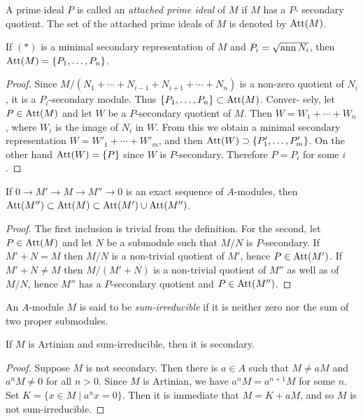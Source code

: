 A prime ideal $P$ is called an \emph{attached prime ideal} of $M$ if $M$ has a $P$-
secondary quotient. The set of the attached prime ideals of $M$ is denoted by
$\operatorname{Att}(M)$.

\begin{theorem}\label{thm:6.9}
If $(*)$ is a minimal secondary representation of $M$ and $P_i =
\sqrt{\operatorname{ann} N_i}$, then $\operatorname{Att}(M) = \{P_1, \ldots, P_n\}$.
\end{theorem}

\begin{proof}
Since $M/(N_1 + \cdots + N_{i-1} + N_{i+1} + \cdots + N_n)$ is a non-zero quotient
of $N_i$, it is a $P_i$-secondary module. Thus $\{P_1, \ldots, P_n\} \subset \operatorname{Att}(M)$. Conver-
sely, let $P \in \operatorname{Att}(M)$ and let $W$ be a $P$-secondary quotient of $M$. Then $W =
W_1 + \cdots + W_n$, where $W_i$ is the image of $N_i$ in $W$. From this we obtain a
minimal secondary representation $W = W'_1 + \cdots + W'_m$, and then
$\operatorname{Att}(W) \supset \{P'_1, \ldots, P'_m\}$. On the other hand $\operatorname{Att}(W) = \{P\}$ since $W$ is
$P$-secondary. Therefore $P = P_i$ for some $i$.
\end{proof}

\begin{theorem}\label{thm:6.10}
If $0 \to M' \to M \to M'' \to 0$ is an exact sequence of
$A$-modules, then $\operatorname{Att}(M'') \subset \operatorname{Att}(M) \subset \operatorname{Att}(M') \cup \operatorname{Att}(M'')$.
\end{theorem}

\begin{proof}
The first inclusion is trivial from the definition. For the second, let
$P \in \operatorname{Att}(M)$ and let $N$ be a submodule such that $M/N$ is $P$-secondary. If
$M' + N = M$ then $M/N$ is a non-trivial quotient of $M'$, hence $P \in \operatorname{Att}(M')$.
If $M' + N \neq M$ then $M/(M' + N)$ is a non-trivial quotient of $M''$ as well
as of $M/N$, hence $M''$ has a $P$-secondary quotient and $P \in \operatorname{Att}(M'')$.
\end{proof}

An $A$-module $M$ is said to be \emph{sum-irreducible} if it is neither zero nor the
sum of two proper submodules.

\begin{lemma*}\label{lem:6.1}
If $M$ is Artinian and sum-irreducible, then it is secondary.
\end{lemma*}

\begin{proof}
Suppose $M$ is not secondary. Then there is $a \in A$ such that $M \neq aM$
and $a^nM \neq 0$ for all $n > 0$. Since $M$ is Artinian, we have $a^nM = a^{n+1}M$ for
some $n$. Set $K = \{x \in M \mid a^nx = 0\}$. Then it is immediate that $M = K + aM$,
and so $M$ is not sum-irreducible.
\end{proof}

